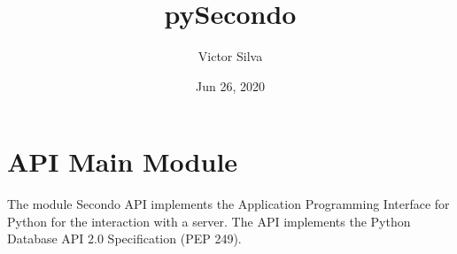 \documentclass[letterpaper,10pt,english]{sphinxmanual}
\title{pySecondo}
\date{Jun 26, 2020}
\author{Victor Silva}
\begin{document}
\pagestyle{empty}
\sphinxmaketitle
\pagestyle{plain}
\sphinxtableofcontents
\pagestyle{normal}
\label{\detokenize{index::doc}}



\chapter{\sphinxhyphen{}API Main Module}
\label{\detokenize{index:module-secondodb.api.secondoapi}}\label{\detokenize{index:sec-api-main-module}}
The module Secondo API implements the Application Programming Interface for Python for the interaction with a 
server. The API implements the Python Database API 2.0 Specification (PEP 249).
\end{document}
